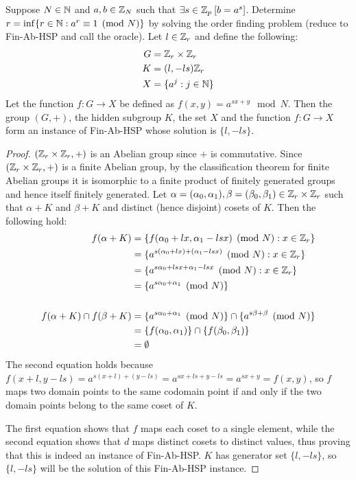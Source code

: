 \begin{lemma}\label{hsp_for_discrete_log}
Suppose $N \in \mathbb{N}$ and $a, b \in \mathbb{Z}_N$ such that $\exists s \in \mathbb{Z}_p\:[b = a^s]$. Determine $r = \inf \{r \in \mathbb{N}: a^r \equiv 1 \pmod{N}\}$ by solving the order finding problem (reduce to Fin-Ab-HSP and call the oracle). Let $l \in \mathbb{Z}_r$ and define the following:
\begin{align*}
    G &= \mathbb{Z}_r \times \mathbb{Z}_r\\
    K &= (l, -ls)\mathbb{Z}_r\\
    X &= \{a^j : j \in \mathbb{N} \}
\end{align*}
Let the function $f: G \rightarrow X$ be defined as $f(x, y) = a^{sx + y} \mod{N}$. Then the group $(G, +)$, the hidden subgroup $K$, the set $X$ and the function $f: G \rightarrow X$ form an instance of Fin-Ab-HSP whose solution is $\{l, -ls\}$.
\end{lemma}
\begin{proof}
$(\mathbb{Z}_r \times \mathbb{Z}_r, +)$ is an Abelian group since $+$ is commutative. Since $(\mathbb{Z}_r \times \mathbb{Z}_r, +)$ is a finite Abelian group, by the classification theorem for finite Abelian groups it is isomorphic to a finite product of finitely generated groups and hence itself finitely generated. Let $\alpha = (\alpha_0, \alpha_1), \beta = (\beta_0, \beta_1) \in \mathbb{Z}_r \times \mathbb{Z}_r$ such that $\alpha + K$ and $\beta + K$ and distinct (hence disjoint) cosets of $K$. Then the following hold:
\begin{align*}
    f(\alpha + K) &= \{f(\alpha_0 + lx, \alpha_1 - lsx) \pmod{N} : x \in \mathbb{Z}_r \}\\
    &= \{a^{s(\alpha_0 + lx) + (\alpha_1 - lsx)} \pmod{N} : x \in \mathbb{Z}_r \}\\
    &= \{a^{s\alpha_0 + lsx + \alpha_1 - lsx} \pmod{N} : x \in \mathbb{Z}_r \}\\
    &= \{a^{s\alpha_0 + \alpha_1} \pmod{N} \}\\\\
    f(\alpha+K) \cap f(\beta+K) &= \{a^{s\alpha_0 + \alpha_1} \pmod{N}\} \cap \{a^{s\beta + \beta} \pmod{N}\}\\
    &= \{f(\alpha_0, \alpha_1)\} \cap \{f(\beta_0, \beta_1)\}\\
    &= \emptyset
\end{align*}
The second equation holds because $f(x + l, y - ls) = a^{s(x+l) + (y - ls)} = a^{sx + ls + y - ls} = a^{sx + y} = f(x, y)$, so $f$ maps two domain points to the same codomain point if and only if the two domain points belong to the same coset of $K$.

The first equation shows that $f$ maps each coset to a single element, while the second equation shows that $d$ maps distinct cosets to distinct values, thus proving that this is indeed an instance of Fin-Ab-HSP. $K$ has generator set $\{l, -ls\}$, so $\{l, -ls\}$ will be the solution of this Fin-Ab-HSP instance.
\end{proof}


